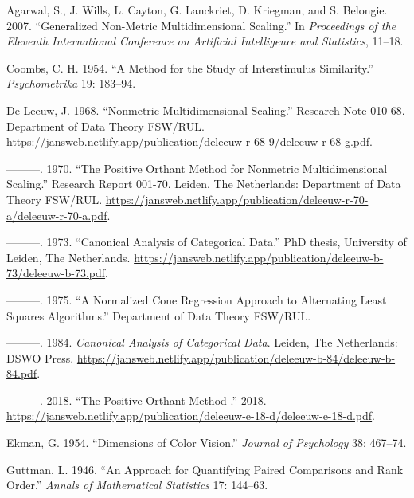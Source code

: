 \documentclass[
  12pt,
]{article}
\newlength{\cslhangindent}
\newenvironment{CSLReferences}[2] %
 {\begin{list}{}{%
  \setlength{\itemindent}{0pt}
  \setlength{\leftmargin}{0pt}
  \setlength{\parsep}{0pt}
  \ifodd #1
   \setlength{\leftmargin}{\cslhangindent}
   \setlength{\itemindent}{-1\cslhangindent}
  \fi
  \setlength{\itemsep}{#2\baselineskip}}}
 {\end{list}}
\begin{document}
\label{refs}
\begin{CSLReferences}{1}{0}
Agarwal, S., J. Wills, L. Cayton, G. Lanckriet, D. Kriegman, and S. Belongie. 2007. {``Generalized Non-Metric Multidimensional Scaling.''} In \emph{Proceedings of the Eleventh International Conference on Artificial Intelligence and Statistics}, 11--18.

Coombs, C. H. 1954. {``A Method for the Study of Interstimulus Similarity.''} \emph{Psychometrika} 19: 183--94.

De Leeuw, J. 1968. {``Nonmetric Multidimensional Scaling.''} Research Note 010-68. Department of Data Theory FSW/RUL. \url{https://jansweb.netlify.app/publication/deleeuw-r-68-9/deleeuw-r-68-g.pdf}.

---------. 1970. {``The Positive Orthant Method for Nonmetric Multidimensional Scaling.''} Research Report 001-70. Leiden, The Netherlands: Department of Data Theory FSW/RUL. \url{https://jansweb.netlify.app/publication/deleeuw-r-70-a/deleeuw-r-70-a.pdf}.

---------. 1973. {``Canonical Analysis of Categorical Data.''} PhD thesis, University of Leiden, The Netherlands. \url{https://jansweb.netlify.app/publication/deleeuw-b-73/deleeuw-b-73.pdf}.

---------. 1975. {``{A Normalized Cone Regression Approach to Alternating Least Squares Algorithms}.''} Department of Data Theory FSW/RUL.

---------. 1984. \emph{Canonical Analysis of Categorical Data}. Leiden, The Netherlands: DSWO Press. \url{https://jansweb.netlify.app/publication/deleeuw-b-84/deleeuw-b-84.pdf}.

---------. 2018. {``{The Positive Orthant Method }.''} 2018. \url{https://jansweb.netlify.app/publication/deleeuw-e-18-d/deleeuw-e-18-d.pdf}.

Ekman, G. 1954. {``{Dimensions of Color Vision}.''} \emph{Journal of Psychology} 38: 467--74.

Guttman, L. 1946. {``{An Approach for Quantifying Paired Comparisons and Rank Order}.''} \emph{Annals of Mathematical Statistics} 17: 144--63.


\end{CSLReferences}
\end{document}
